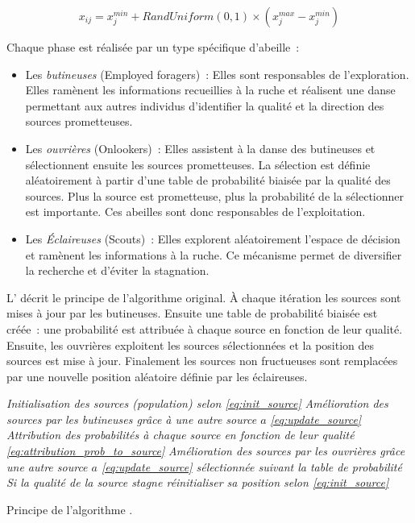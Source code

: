 \begin{equation}\label{eq:init_source}
  x_{ij} = x_{j}^{min} + RandUniform(0, 1) \times (x_{j}^{max} - x_{j}^{min})
\end{equation}

\noindent Chaque phase est réalisée par un type spécifique d’abeille~:
\begin{itemize}
  \item Les \textit{butineuses} (Employed foragers)~: Elles sont responsables de l’exploration.
        Elles ramènent les informations recueillies à la ruche et réalisent une danse
        permettant aux autres individus d’identifier la qualité et la direction des
        sources prometteuses.
  \item Les \textit{ouvrières} (Onlookers)~: Elles assistent à la danse des butineuses
        et sélectionnent ensuite les sources prometteuses. La sélection est définie
        aléatoirement à partir d’une table de probabilité biaisée par la qualité des sources.
        Plus la source est prometteuse, plus la probabilité de la sélectionner est importante.
        Ces abeilles sont donc responsables de l’exploitation.
  \item Les \textit{Éclaireuses} (Scouts)~: Elles explorent aléatoirement l’espace
        de décision et ramènent les informations à la ruche. Ce mécanisme
        permet de diversifier la recherche et d’éviter la stagnation.
\end{itemize}

L’ décrit le principe de l’algorithme  original.
À chaque itération les sources sont mises à jour par les butineuses. Ensuite une
table de probabilité biaisée est créée~: une probabilité est attribuée à chaque source
en fonction de leur qualité. Ensuite, les ouvrières exploitent les sources sélectionnées
et la position des sources est mise à jour. Finalement les sources non fructueuses sont
remplacées par une nouvelle position aléatoire définie par les éclaireuses.
\begin{algorithm}
  \SetAlgoVlined
  \emph{Initialisation des sources (population) selon \eqref{eq:init_source}}\;
  {
  {
    \emph{Amélioration des sources par les butineuses grâce à une autre source $a$ \eqref{eq:update_source}}\;
    \emph{Attribution des probabilités à chaque source en fonction de leur qualité
          \eqref{eq:attribution_prob_to_source}}\;
    \emph{Amélioration des sources par les ouvrières grâce une autre source $a$ \eqref{eq:update_source}
          sélectionnée suivant la table de probabilité}\;
    \emph{Si la qualité de la source stagne réinitialiser sa position selon \eqref{eq:init_source}}\;
  }
  }
  \caption{Principe de l’algorithme .}
  \label{alg:ABC_phases}
\end{algorithm}

